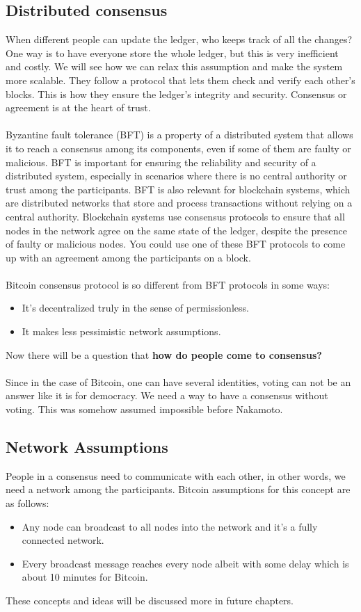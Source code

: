 \subsection{Distributed consensus}
 When different people can update the ledger, who keeps track of all the changes? One way is to have everyone store the whole ledger, but this is very inefficient and costly. We will see how we can relax this assumption and make the system more scalable. They follow a protocol that lets them check and verify each other’s blocks. This is how they ensure the ledger’s integrity and security. Consensus or agreement is at the heart of trust.\\\\
Byzantine fault tolerance (BFT) is a property of a distributed system that allows it to reach a consensus among its components, even if some of them are faulty or malicious. BFT is important for ensuring the reliability and security of a distributed system, especially in scenarios where there is no central authority or trust among the participants. BFT is also relevant for blockchain systems, which are distributed networks that store and process transactions without relying on a central authority. Blockchain systems use consensus protocols to ensure that all nodes in the network agree on the same state of the ledger, despite the presence of faulty or malicious nodes.  You could use one of these BFT protocols to come up with an agreement among the participants on a block.\\\\
Bitcoin consensus protocol is so different from BFT protocols in some ways:
\begin{itemize}
    \item It's decentralized truly in the sense of permissionless.
    \item It makes less pessimistic network assumptions.
\end{itemize}
Now there will be a question that  \textbf{how do people come to consensus?}\\\\
Since in the case of Bitcoin, one can have several identities,  voting can not be an answer like it is for democracy. We need a way to have a consensus without voting. This was somehow assumed impossible before Nakamoto.
\subsection{Network Assumptions}
People in a consensus need to communicate with each other, in other words, we need a network among the participants.
Bitcoin assumptions for this concept are as follows:
\begin{itemize}
    \item Any node can broadcast to all nodes into the network and it's a fully connected network.
    \item Every broadcast message reaches every node albeit with some delay which is about 10 minutes for Bitcoin. 
\end{itemize}
These concepts and ideas will be discussed more in future chapters.

